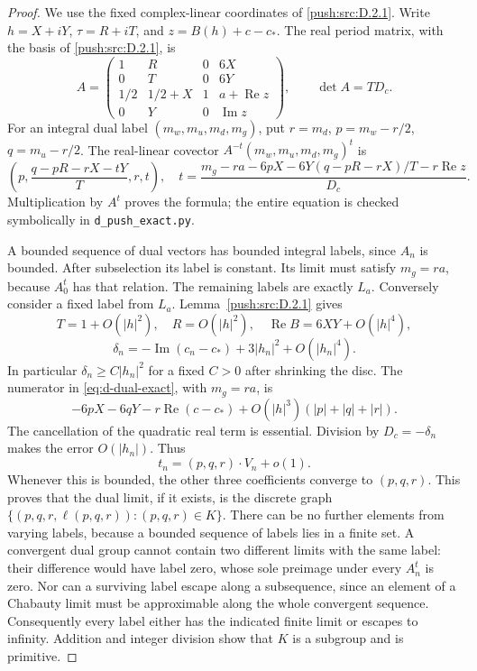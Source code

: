 \begin{proof}
We use the fixed complex-linear coordinates of \ref{push:src:D.2.1}. Write
\(h=X+iY\), \(\tau=R+iT\), and
\(z=B(h)+c-c_*\). The real period matrix, with the basis of \ref{push:src:D.2.1},
is
\[
 A=\begin{pmatrix}
 1&R&0&6X\\
 0&T&0&6Y\\
 1/2&1/2+X&1&a+\operatorname{Re}z\\
 0&Y&0&\operatorname{Im}z
 \end{pmatrix},\qquad
 \det A=T D_c.
\]
For an integral dual label \((m_w,m_u,m_d,m_g)\), put
\(r=m_d\), \(p=m_w-r/2\), \(q=m_u-r/2\).
The real-linear covector \(A^{-t}(m_w,m_u,m_d,m_g)^t\) is
\begin{equation}\label{eq:d-dual-exact}
 \left(p,\frac{q-pR-rX-tY}{T},r,t\right),\quad
 t=\frac{m_g-ra-6pX-6Y(q-pR-rX)/T-r\operatorname{Re}z}{D_c}.
\end{equation}
Multiplication by \(A^t\) proves the formula; the entire equation is
checked symbolically in \texttt{d\_push\_exact.py}.

A bounded sequence of dual vectors has bounded integral labels,
since \(A_n\) is bounded. After subselection its label is constant.
Its limit must satisfy \(m_g=ra\), because
\(A_0^t\) has that relation. The remaining labels are exactly
\(L_a\). Conversely consider a fixed label from \(L_a\).
Lemma~\ref{push:src:D.2.1} gives
\[
 T=1+O(|h|^2),\quad R=O(|h|^2),\quad
 \operatorname{Re}B=6XY+O(|h|^4),
\]
\[
 \delta_n=-\operatorname{Im}(c_n-c_*)
                       +3|h_n|^2+O(|h_n|^4).
\]
In particular \(\delta_n\ge C|h_n|^2\) for a fixed \(C>0\)
after shrinking the disc. The numerator in
\eqref{eq:d-dual-exact}, with \(m_g=ra\), is
\[
 -6pX-6qY-r\operatorname{Re}(c-c_*)
       +O(|h|^3)(|p|+|q|+|r|).
\]
The cancellation of the quadratic real term is essential. Division
by \(D_c=-\delta_n\) makes the error \(O(|h_n|)\). Thus
\[
 t_n=(p,q,r)\cdot V_n+o(1).
\]
Whenever this is bounded, the other three coefficients converge to
\((p,q,r)\). This proves that the dual limit, if it exists, is the
discrete graph
\(\{(p,q,r,\ell(p,q,r)):(p,q,r)\in K\}\).
There can be no further elements from varying labels, because a
bounded sequence of labels lies in a finite set. A convergent dual
group cannot contain two different limits with the same label: their
difference would have label zero, whose sole preimage under every
\(A_n^t\) is zero. Nor can a surviving label escape along a
subsequence, since an element of a Chabauty limit must be approximable
along the whole convergent sequence. Consequently every label either
has the indicated finite limit or escapes to infinity. Addition and
integer division show that \(K\) is a subgroup and is primitive.


\end{proof}
